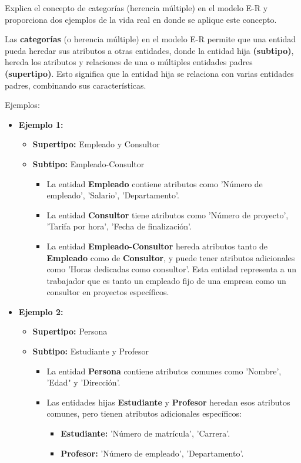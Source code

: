 
Explica el concepto de categorías (herencia múltiple) en el modelo E-R y proporciona dos ejemplos de la vida real en donde se aplique este concepto.

Las \textbf{categorías} (o herencia múltiple) en el modelo E-R permite que una entidad pueda heredar sus atributos a otras entidades, donde la entidad hija \textbf{(subtipo)}, hereda los atributos y relaciones de una o múltiples entidades padres \textbf{(supertipo)}. Esto significa que la entidad hija se relaciona con varias entidades padres, combinando sus características.

Ejemplos:
\begin{itemize}
    \item \textbf{Ejemplo 1:}
    \begin{itemize}
        \item \textbf{Supertipo: } Empleado y Consultor
        \item \textbf{Subtipo:} Empleado-Consultor
        
    \begin{itemize}
        \item La entidad \textbf{Empleado} contiene atributos como 'Número de empleado', 'Salario', 'Departamento'.
        \item La entidad \textbf{Consultor} tiene atributos como 'Número de proyecto', 'Tarifa por hora', 'Fecha de finalización'.
        \item La entidad \textbf{Empleado-Consultor} hereda atributos tanto de \textbf{Empleado} como de \textbf{Consultor}, y puede tener atributos adicionales como 'Horas dedicadas como consultor'. Esta entidad representa a un trabajador que es tanto un empleado fijo de una empresa como un consultor en proyectos específicos.
    \end{itemize}
    \end{itemize}

    \item \textbf{Ejemplo 2:}
    \begin{itemize}
         \item \textbf{Supertipo:} Persona
        \item \textbf{Subtipo:} Estudiante y Profesor
        
    \begin{itemize}
        \item La entidad \textbf{Persona} contiene atributos comunes como 'Nombre', 'Edad" y 'Dirección'.
        \item Las entidades hijas \textbf{Estudiante} y \textbf{Profesor} heredan esos atributos comunes, pero tienen atributos adicionales específicos:
        \begin{itemize}
            \item \textbf{Estudiante:} 'Número de matrícula', 'Carrera'.
            \item \textbf{Profesor:} 'Número de empleado', 'Departamento'.
        \end{itemize}
    \end{itemize}
    \end{itemize}
\end{itemize}
